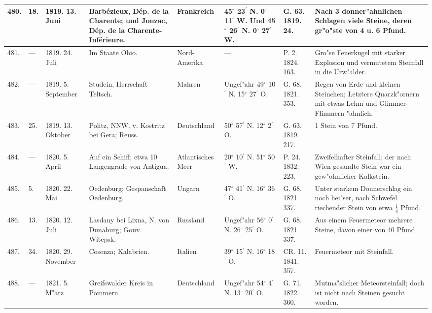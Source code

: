 \documentclass[a4paper, 8pt, oneside, polutonikogreek, german]{article}
\begin{document}
\begin{center}
\begin{longtable}{| p{5mm} | p{3mm} | p{15mm} | p{25mm} | p{20mm} | p{14mm} | p{17mm} | p{24mm} |}
        480. & 18. & 1819. 13. Juni & Barbézieux, Dép. de la Charente; und Jonzac, Dép. de la Charente-Inférieure. & Frankreich & 45$^\circ$ 23$^\prime$ N. 0$^\circ$ 11$^\prime$ W. Und 45$^\circ$ 26$^\prime$ N. 0$^\circ$ 27$^\prime$ W. & G. 63. 1819. 24. & Nach 3 donner"ahnlichen Schlagen viele Steine, deren gr"o"ste von 4 u. 6 Pfund. \\ \hline
        481. & --- & 1819. 24. Juli & Im Staate Ohio. & Nord-Amerika & --- & P. 2. 1824. 163. & Gro"se Feuerkugel mit starker Explosion und vermutetem Steinfall in die Urw"alder. \\ \hline
        482. & --- & 1819. 5. September & Studein, Herrschaft Teltsch. & Mahren & Ungef"ahr 49$^\circ$ 10$^\prime$ N. 15$^\circ$ 27$^\prime$ O. & G. 68. 1821. 353. & Regen von Erde und kleinen Steinchen; Letztere Quarzk"ornern mit etwas Lehm und Glimmer-Flimmern "ahnlich. \\ \hline
        483. & 25. & 1819. 13. Oktober & Politz, NNW. v. Kostritz bei Gera; Reuss. & Deutschland & 50$^\circ$ 57$^\prime$ N. 12$^\circ$ 2$^\prime$ O. & G. 63. 1819. 217. & 1 Stein von 7 Pfund. \\ \hline
        484. & --- & 1820. 5. April & Auf ein Schiff; etwa 10 Langengrade von Antigua. & Atlantisches Meer & 20$^\circ$ 10$^\prime$ N. 51$^\circ$ 50$^\prime$ W. & P. 24. 1832. 223. & Zweifelhafter Steinfall; der nach Wien gesandte Stein war ein gew"ohnlicher Kalkstein. \\ \hline
        485. & 5. & 1820. 22. Mai & Oedenburg; Gespanschaft Oedenburg. & Ungarn & 47$^\circ$ 41$^\prime$ N. 16$^\circ$ 36$^\prime$ O. & G. 68. 1821. 337. & Unter starkem Donnerschlag ein noch hei"ser, nach Schwefel riechender Stein von etwa $\frac{1}{4}$ Pfund. \\ \hline
        486. & 13. & 1820. 12. Juli & Lasdany bei Lixna, N. von Dunaburg; Gouv. Witepsk. & Russland & Ungef"ahr 56$^\circ$ 0$^\prime$ N. 26$^\circ$ 25$^\prime$ O. & G. 68. 1821. 337. & Aus einem Feuermeteor mehrere Steine, davon einer von 40 Pfund. \\ \hline
        487. & 34. & 1820. 29. November & Cosenza; Kalabrien. & Italien & 39$^\circ$ 15$^\prime$ N. 16$^\circ$ 18$^\prime$ O. & CR. 11. 1841. 357. & Feuermeteor mit Steinfall. \\ \hline
        488. & --- & 1821. 5. M"arz & Greifswalder Kreis in Pommern. & Deutschland & Ungef"ahr 54$^\circ$ 4$^\prime$ N. 13$^\circ$ 20$^\prime$ O. & G. 71. 1822. 360. & Mutma"slicher Meteorsteinfall; doch ist nicht nach Steinen gesucht worden. \\ \hline

\end{longtable}
\end{center}
\end{document}
